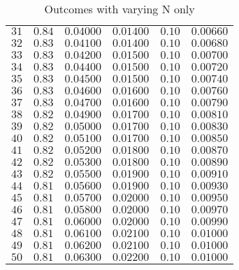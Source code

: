 \begin{table}[\hbtp]
\begin{center}
\begin{tabular}{rrrrrr}
$31$&$0.84$&$0.04000$&$0.01400$&$0.10$&$0.00660$\tabularnewline
$32$&$0.83$&$0.04100$&$0.01400$&$0.10$&$0.00680$\tabularnewline
$33$&$0.83$&$0.04200$&$0.01500$&$0.10$&$0.00700$\tabularnewline
$34$&$0.83$&$0.04400$&$0.01500$&$0.10$&$0.00720$\tabularnewline
$35$&$0.83$&$0.04500$&$0.01500$&$0.10$&$0.00740$\tabularnewline
$36$&$0.83$&$0.04600$&$0.01600$&$0.10$&$0.00760$\tabularnewline
$37$&$0.83$&$0.04700$&$0.01600$&$0.10$&$0.00790$\tabularnewline
$38$&$0.82$&$0.04900$&$0.01700$&$0.10$&$0.00810$\tabularnewline
$39$&$0.82$&$0.05000$&$0.01700$&$0.10$&$0.00830$\tabularnewline
$40$&$0.82$&$0.05100$&$0.01700$&$0.10$&$0.00850$\tabularnewline
$41$&$0.82$&$0.05200$&$0.01800$&$0.10$&$0.00870$\tabularnewline
$42$&$0.82$&$0.05300$&$0.01800$&$0.10$&$0.00890$\tabularnewline
$43$&$0.82$&$0.05500$&$0.01900$&$0.10$&$0.00910$\tabularnewline
$44$&$0.81$&$0.05600$&$0.01900$&$0.10$&$0.00930$\tabularnewline
$45$&$0.81$&$0.05700$&$0.02000$&$0.10$&$0.00950$\tabularnewline
$46$&$0.81$&$0.05800$&$0.02000$&$0.10$&$0.00970$\tabularnewline
$47$&$0.81$&$0.06000$&$0.02000$&$0.10$&$0.00990$\tabularnewline
$48$&$0.81$&$0.06100$&$0.02100$&$0.10$&$0.01000$\tabularnewline
$49$&$0.81$&$0.06200$&$0.02100$&$0.10$&$0.01000$\tabularnewline
$50$&$0.81$&$0.06300$&$0.02200$&$0.10$&$0.01000$\tabularnewline
\hline
\end{tabular}

\end{center}

\caption{Outcomes with varying N only\label{tbl:N_varying_only}} 

\end{table}

